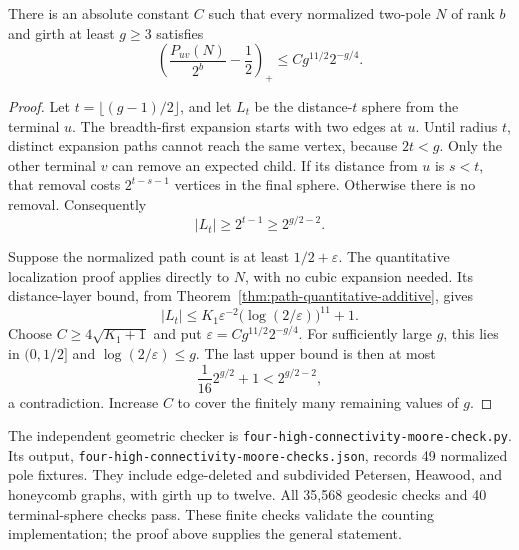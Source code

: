 \begin{proposition}
\label{prop:four-girth-path-excess}
There is an absolute constant $C$ such that every normalized two-pole $N$ of rank $b$ and girth at least $g\ge3$ satisfies
\[
 \left(\frac{P_{uv}(N)}{2^b}-\frac12\right)_+
 \le C g^{11/2}2^{-g/4}.
\]
\end{proposition}

\begin{proof}
Let $t=\lfloor(g-1)/2\rfloor$, and let $L_t$ be the distance-$t$ sphere from the terminal $u$.
The breadth-first expansion starts with two edges at $u$.
Until radius $t$, distinct expansion paths cannot reach the same vertex, because $2t<g$.
Only the other terminal $v$ can remove an expected child.
If its distance from $u$ is $s<t$, that removal costs $2^{t-s-1}$ vertices in the final sphere.
Otherwise there is no removal.
Consequently
\[
 |L_t|\ge2^{t-1}\ge2^{g/2-2}.
\]

Suppose the normalized path count is at least $1/2+\varepsilon$.
The quantitative localization proof applies directly to $N$, with no cubic expansion needed.
Its distance-layer bound, from Theorem~\ref{thm:path-quantitative-additive}, gives
\[
 |L_t|\le K_1\varepsilon^{-2}\bigl(\log(2/\varepsilon)\bigr)^{11}+1.
\]
Choose $C\ge4\sqrt{K_1+1}$ and put $\varepsilon=Cg^{11/2}2^{-g/4}$.
For sufficiently large $g$, this lies in $(0,1/2]$ and $\log(2/\varepsilon)\le g$.
The last upper bound is then at most
\[
 \frac1{16}2^{g/2}+1<2^{g/2-2},
\]
a contradiction.
Increase $C$ to cover the finitely many remaining values of $g$.
\end{proof}

The independent geometric checker is \texttt{four-high-connectivity-moore-check.py}.
Its output, \texttt{four-high-connectivity-moore-checks.json}, records 49 normalized pole fixtures.
They include edge-deleted and subdivided Petersen, Heawood, and honeycomb graphs, with girth up to twelve.
All 35,568 geodesic checks and 40 terminal-sphere checks pass.
These finite checks validate the counting implementation; the proof above supplies the general statement.
